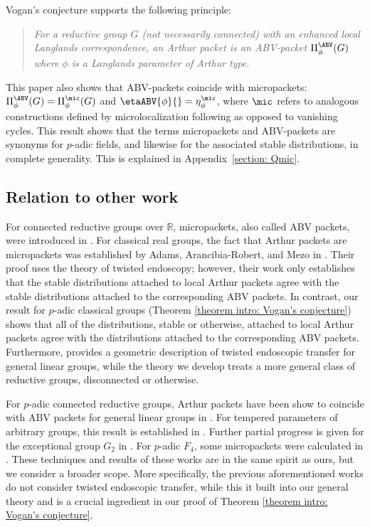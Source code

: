 \documentclass[11pt,letterpaper]{amsart}
\numberwithin{equation}{section}
\begin{document}
 Vogan's conjecture supports the following principle:
    \begin{quotation}
    {\it For a reductive group $G$ (not necessarily connected) with an enhanced local Langlands correspondence, an Arthur packet is an ABV-packet $\Pi^\ABV_\phi(G)$ where $\phi$ is a Langlands parameter of Arthur type}.
    \end{quotation}
This paper also shows that ABV-packets coincide with micropackets:
$\Pi^\ABV_{\phi}(G) = \Pi_{\phi}^\mic(G)$
and $\etaABV{\phi}{} =\eta^\mic_{\phi}{}$, 
where $\mic$ refers to analogous constructions defined by microlocalization following \cites{ABV92,Vog93} as opposed to vanishing cycles. This result shows that the terms micropackets and ABV-packets are synonyms for $p$-adic fields, and likewise for the associated stable distributions, in complete generality. This is explained in Appendix~\ref{section: Qmic}.



\subsection*{Relation to other work}
For connected reductive groups over $\mathbb{R}$, micropackets, also called ABV packets, were introduced in \cite{ABV92}. For classical real groups, the fact that Arthur packets are micropackets was established by Adams, Arancibia-Robert, and Mezo in \cite{AAM24}. Their proof uses the theory of twisted endoscopy; however, their work only establishes that the stable distributions attached to local Arthur packets agree with the stable distributions attached to the corresponding ABV packets. In contrast, our result for $p$-adic classical groups (Theorem \ref{theorem intro: Vogan's conjecture}) shows that all of the distributions, stable or otherwise, attached to local Arthur packets agree with the distributions attached to the corresponding ABV packets. Furthermore, \cite{AAM24} provides a geometric description of twisted endoscopic transfer for general linear groups, while the theory we develop treats a more general class of reductive groups, disconnected or otherwise.

For $p$-adic connected reductive groups, Arthur packets have been show to coincide with ABV packets for general linear groups in \cites{CR1, CR2, Lo24, Rid23}.
For tempered parameters of arbitrary groups, this result is established in \cite{CDFZ25}. Further partial progress is given for the exceptional group $G_2$ in \cite{CFZ2}. 
For $p$-adic $F_4$, some micropackets were calculated in \cite{BL26}.
These techniques and results of these works are in the same spirit as ours, but we consider a broader scope. More specifically, the previous aforementioned works do not consider twisted endoscopic transfer, while this it built into our general theory and is a crucial ingredient in our proof of Theorem \ref{theorem intro: Vogan's conjecture}.
 
\end{document}
